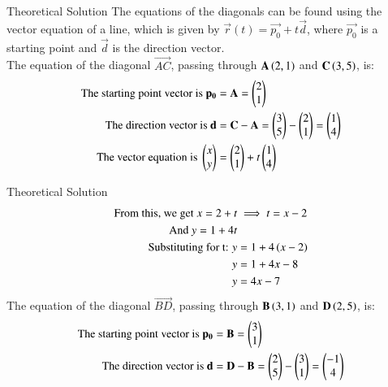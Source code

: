 \documentclass{beamer}
\begin{document}
\begin{frame}{Theoretical Solution}
The equations of the diagonals can be found using the vector equation of a line, which is given by $\vec{r}(t) = \vec{p_0} + t\vec{d}$, where $\vec{p_0}$ is a starting point and $\vec{d}$ is the direction vector.\\

The equation of the diagonal $\vec{AC}$, passing through $\mathbf{A}\left(2, 1\right)$ and $\mathbf{C}\left(3, 5\right)$, is:
\begin{align}
    \text{The starting point vector is } \mathbf{p_0} &= \mathbf{A} = \begin{pmatrix}2\\1\end{pmatrix} \\
    \text{The direction vector is } \mathbf{d} &= \mathbf{C} - \mathbf{A} = \begin{pmatrix}3\\5\end{pmatrix} - \begin{pmatrix}2\\1\end{pmatrix} = \begin{pmatrix}1\\4\end{pmatrix} \\
    \text{The vector equation is } \begin{pmatrix}x\\y\end{pmatrix} &= \begin{pmatrix}2\\1\end{pmatrix} + t\begin{pmatrix}1\\4\end{pmatrix} \\
\end{align}
\end{frame}
\begin{frame}{Theoretical Solution}
\begin{align}
 \text{From this, we get } x = 2 + t &\implies t = x-2 \\
    \text{And } y = 1 + 4t \\
    \text{Substituting for t: } y &= 1 + 4\left(x-2\right) \\
    y &= 1 + 4x - 8 \\
    y &= 4x - 7
\end{align}
The equation of the diagonal $\vec{BD}$, passing through $\mathbf{B}\left(3, 1\right)$ and $\mathbf{D}\left(2, 5\right)$, is:
\begin{align}
    \text{The starting point vector is } \vec{p_0} &= \vec{B} = \myvec{3\\1} \\
    \text{The direction vector is } \vec{d} &= \vec{D} - \vec{B} = \myvec{2\\5} - \myvec{3\\1} = \myvec{-1\\4} \\
    
\end{align}
\end{frame}
\end{document}
